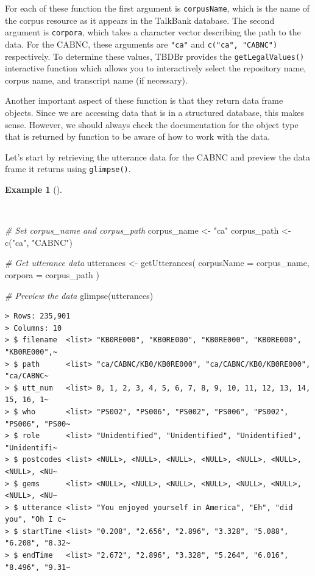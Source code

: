 \documentclass[
  letterpaper,
]{latex/krantz}
\newenvironment{Shaded}{\begin{snugshade}}{\end{snugshade}}
\newcommand{\AttributeTok}[1]{\textcolor[rgb]{0.00,0.00,0.00}{#1}}
\newcommand{\CommentTok}[1]{\textcolor[rgb]{0.00,0.00,0.00}{\textit{#1}}}
\newcommand{\FunctionTok}[1]{\textcolor[rgb]{0.00,0.00,0.00}{#1}}
\newcommand{\NormalTok}[1]{\textcolor[rgb]{0.00,0.00,0.00}{#1}}
\newcommand{\OtherTok}[1]{\textcolor[rgb]{0.00,0.00,0.00}{#1}}
\newcommand{\StringTok}[1]{\textcolor[rgb]{0.00,0.00,0.00}{#1}}
\theoremstyle{definition}
\newtheorem{example}{Example}[chapter]
\theoremstyle{remark}
\begin{document}
For each of these function the first argument is \texttt{corpusName},
which is the name of the corpus resource as it appears in the TalkBank
database. The second argument is \texttt{corpora}, which takes a
character vector describing the path to the data. For the CABNC, these
arguments are \texttt{"ca"} and \texttt{c("ca",\ "CABNC")} respectively.
To determine these values, TBDBr provides the \texttt{getLegalValues()}
interactive function which allows you to interactively select the
repository name, corpus name, and transcript name (if necessary).

Another important aspect of these function is that they return data
frame objects. Since we are accessing data that is in a structured
database, this makes sense. However, we should always check the
documentation for the object type that is returned by function to be
aware of how to work with the data.

Let's start by retrieving the utterance data for the CABNC and preview
the data frame it returns using \texttt{glimpse()}.

\begin{example}[]\protect\hypertarget{exm-ad-get-utterances}{}\label{exm-ad-get-utterances}

~

\begin{Shaded}
\begin{Highlighting}[]
\CommentTok{\# Set corpus\_name and corpus\_path}
\NormalTok{corpus\_name }\OtherTok{\textless{}{-}} \StringTok{"ca"}
\NormalTok{corpus\_path }\OtherTok{\textless{}{-}} \FunctionTok{c}\NormalTok{(}\StringTok{"ca"}\NormalTok{, }\StringTok{"CABNC"}\NormalTok{)}

\CommentTok{\# Get utterance data}
\NormalTok{utterances }\OtherTok{\textless{}{-}}
  \FunctionTok{getUtterances}\NormalTok{(}
    \AttributeTok{corpusName =}\NormalTok{ corpus\_name,}
    \AttributeTok{corpora =}\NormalTok{ corpus\_path}
\NormalTok{    )}

\CommentTok{\# Preview the data}
\FunctionTok{glimpse}\NormalTok{(utterances)}
\end{Highlighting}
\end{Shaded}

\begin{verbatim}
> Rows: 235,901
> Columns: 10
> $ filename  <list> "KB0RE000", "KB0RE000", "KB0RE000", "KB0RE000", "KB0RE000",~
> $ path      <list> "ca/CABNC/KB0/KB0RE000", "ca/CABNC/KB0/KB0RE000", "ca/CABNC~
> $ utt_num   <list> 0, 1, 2, 3, 4, 5, 6, 7, 8, 9, 10, 11, 12, 13, 14, 15, 16, 1~
> $ who       <list> "PS002", "PS006", "PS002", "PS006", "PS002", "PS006", "PS00~
> $ role      <list> "Unidentified", "Unidentified", "Unidentified", "Unidentifi~
> $ postcodes <list> <NULL>, <NULL>, <NULL>, <NULL>, <NULL>, <NULL>, <NULL>, <NU~
> $ gems      <list> <NULL>, <NULL>, <NULL>, <NULL>, <NULL>, <NULL>, <NULL>, <NU~
> $ utterance <list> "You enjoyed yourself in America", "Eh", "did you", "Oh I c~
> $ startTime <list> "0.208", "2.656", "2.896", "3.328", "5.088", "6.208", "8.32~
> $ endTime   <list> "2.672", "2.896", "3.328", "5.264", "6.016", "8.496", "9.31~
\end{verbatim}

\end{example}
\end{document}

